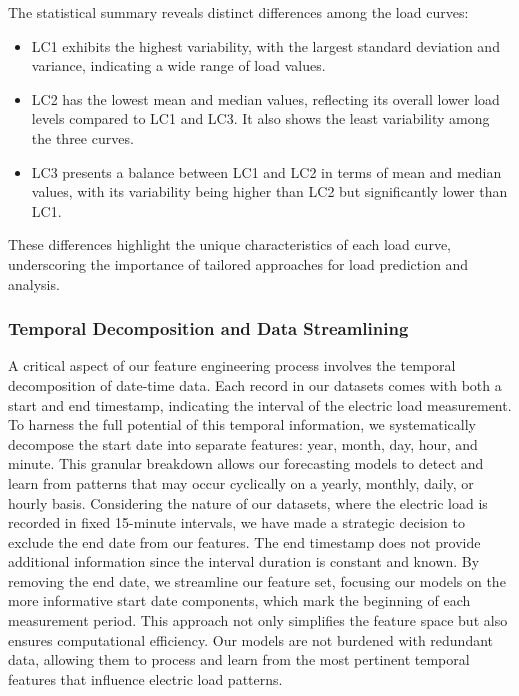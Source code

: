 \documentclass{article} %
\begin{document}
The statistical summary reveals distinct differences among the load curves:
\begin{itemize}
    \item LC1 exhibits the highest variability, with the largest standard deviation and variance, indicating a wide range of load values.
    \item LC2 has the lowest mean and median values, reflecting its overall lower load levels compared to LC1 and LC3. It also shows the least variability among the three curves.
    \item LC3 presents a balance between LC1 and LC2 in terms of mean and median values, with its variability being higher than LC2 but significantly lower than LC1.
\end{itemize}

These differences highlight the unique characteristics of each load curve, underscoring the importance of tailored approaches for load prediction and analysis.


\subsubsection{Temporal Decomposition and Data Streamlining}
A critical aspect of our feature engineering process involves the temporal decomposition of date-time data. Each record in our datasets comes with both a start and end timestamp, indicating the interval of the electric load measurement. To harness the full potential of this temporal information, we systematically decompose the start date into separate features: year, month, day, hour, and minute. This granular breakdown allows our forecasting models to detect and learn from patterns that may occur cyclically on a yearly, monthly, daily, or hourly basis. 
Considering the nature of our datasets, where the electric load is recorded in fixed 15-minute intervals, we have made a strategic decision to exclude the end date from our features. The end timestamp does not provide additional information since the interval duration is constant and known. By removing the end date, we streamline our feature set, focusing our models on the more informative start date components, which mark the beginning of each measurement period. This approach not only simplifies the feature space but also ensures computational efficiency. Our models are not burdened with redundant data, allowing them to process and learn from the most pertinent temporal features that influence electric load patterns. 
\end{document}

